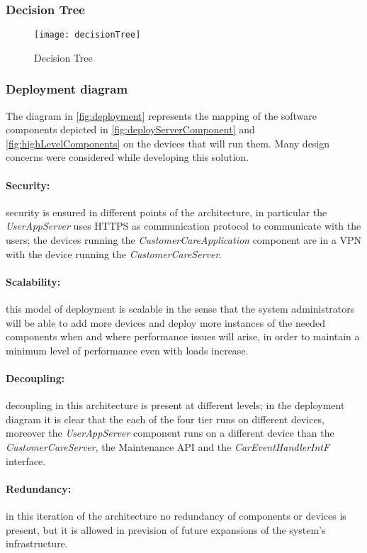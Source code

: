 \subsubsection{Decision Tree}
\begin{figure}[h!]
	\centering
	\texttt{[image: decisionTree]}
	\caption{
		\label{fig:decisionTree} 
		Decision Tree
	}
\end{figure}
\clearpage
\subsubsection{Deployment diagram}
The diagram in \autoref{fig:deployment} represents the mapping of the software components depicted in \autoref{fig:deployServerComponent} and \autoref{fig:highLevelComponents} on the devices that will run them. Many design concerns were considered while developing this solution.
\paragraph{Security:}security is ensured in different points of the architecture, in particular the \emph{UserAppServer} uses HTTPS as communication protocol to communicate with the users; the devices running the \emph{CustomerCareApplication} component are in a VPN with the device running the \emph{CustomerCareServer}.
\paragraph{Scalability:}this model of deployment is scalable in the sense that the system administrators will be able to add more devices and deploy more instances of the needed components when and where performance issues will arise, in order to maintain a minimum level of performance even with loads increase.
\paragraph{Decoupling:}decoupling in this architecture is present at different levels; in the deployment diagram it is clear that the each of the four tier runs on different devices, moreover the \emph{UserAppServer} component runs on a different device than the \emph{CustomerCareServer}, the Maintenance API and the \textit{CarEventHandlerIntF} interface.
\paragraph{Redundancy:}in this iteration of the architecture no redundancy of components or devices is present, but it is allowed in prevision of future expansions of the system's infrastructure.
